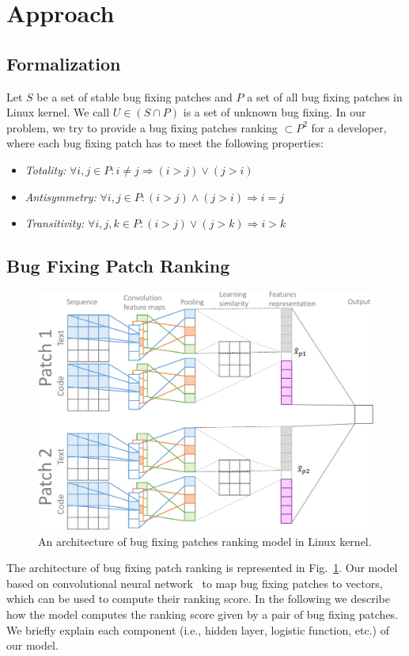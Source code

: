 \section{Approach}
\label{sec:approach}
\subsection{Formalization}
\label{sec:formalization}

Let $S$ be a set of stable bug fixing patches and $P$ a set of all bug fixing patches in Linux kernel. We call $U \in (S \cap P ) $ is a set of unknown bug fixing. In our problem, we try to provide a bug fixing patches ranking $\subset P^2$ for a developer, where each bug fixing patch has to meet the following properties:
\begin{itemize}
	\item \textit{Totality:} $\forall i,j \in P: i \neq j \Rightarrow (i > j) \vee (j > i)$
	\item \textit{Antisymmetry:} $\forall i,j \in P: (i > j) \wedge (j > i) \Rightarrow i = j$ 
	\item \textit{Transitivity:} $\forall i,j,k \in P: (i > j) \vee (j > k) \Rightarrow i > k$ 
\end{itemize}

\subsection{Bug Fixing Patch Ranking}
\label{sec:bugranking}
\begin{figure}[t!]
	\centering
	\includegraphics[width=1.0\textwidth]{BugPatchingRanking-cropped.pdf}
	\caption{An architecture of bug fixing patches ranking model in Linux kernel.}
	\label{fig:bugranking}
\end{figure}

The architecture of bug fixing patch ranking is represented in Fig.~\ref{fig:bugranking}. Our model based on convolutional neural network~\cite{lecun1995convolutional} to map bug fixing patches to vectors, which can be used to compute their ranking score. In the following we describe how the model computes the ranking score given by a pair of bug fixing patches. We briefly explain each component (i.e., hidden layer, logistic function, etc.) of our model.



